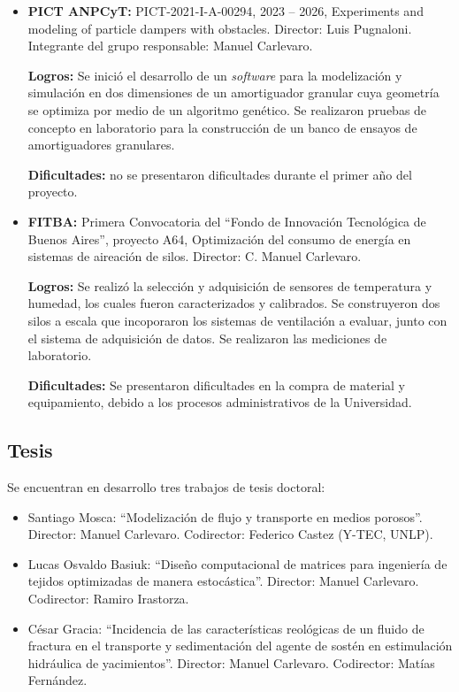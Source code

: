 \documentclass[a4paper,11pt,twoside,final,titlepage,onecolumn,openright]{report}
\begin{document}
\begin{itemize}
 {\bf Dificultades:} no se produjeron dificultades en el desarrollo del proyecto.

\item \textbf{PICT ANPCyT:} PICT-2021-I-A-00294, 2023 -- 2026, Experiments and modeling of particle dampers with obstacles. Director: Luis Pugnaloni. Integrante del grupo responsable: Manuel Carlevaro.

    \textbf{Logros: } Se inició el desarrollo de un \textit{software} para la modelización y simulación en dos dimensiones de un amortiguador granular cuya geometría se optimiza por medio de un algoritmo genético. Se realizaron pruebas de concepto en laboratorio para la construcción de un banco de ensayos de amortiguadores granulares.

\textbf{Dificultades:} no se presentaron dificultades durante el primer año del proyecto.

\item \textbf{FITBA:} Primera Convocatoria del ``Fondo de Innovación Tecnológica de Buenos Aires'', proyecto A64, Optimización del consumo de energía en sistemas de aireación de silos. Director: C. Manuel Carlevaro.

    \textbf{Logros: } Se realizó la selección y adquisición de sensores de temperatura y humedad, los cuales fueron caracterizados y calibrados. Se construyeron dos silos a escala que incoporaron los sistemas de ventilación a evaluar, junto con el sistema de adquisición de datos. Se realizaron las mediciones de laboratorio. 

\textbf{Dificultades:} Se presentaron dificultades en la compra de material y equipamiento, debido a los procesos administrativos de la Universidad. 

\end{itemize}

\subsection{Tesis}

Se encuentran en desarrollo tres trabajos de tesis doctoral:
\begin{itemize}
 \item Santiago Mosca: ``Modelización de flujo y transporte en medios porosos''. Director: Manuel Carlevaro. Codirector: Federico Castez (Y-TEC, UNLP).
 \item Lucas Osvaldo Basiuk: ``Diseño computacional de matrices para ingeniería de tejidos optimizadas de manera estocástica''. Director: Manuel Carlevaro. Codirector: Ramiro Irastorza.
\item César Gracia: ``Incidencia de las características reológicas de un fluido de fractura en el transporte y sedimentación del agente de sostén en estimulación hidráulica de yacimientos''. Director: Manuel Carlevaro. Codirector: Matías Fernández.
\end{itemize}
\end{document}
